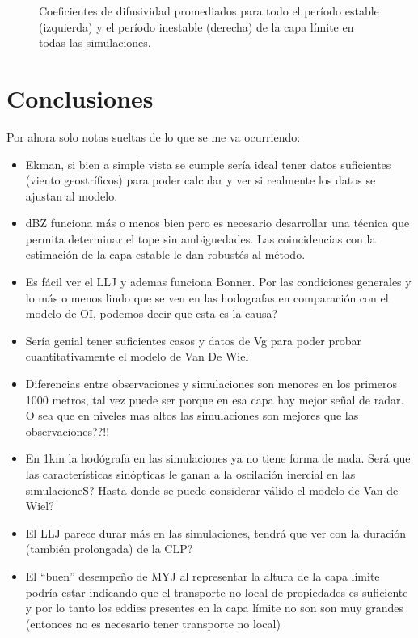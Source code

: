 \documentclass[12pt,spanish,oneside, a4paper]{book}
\providecommand{\tightlist}{%
  \setlength{\itemsep}{0pt}\setlength{\parskip}{0pt}}
\begin{document}
\begin{figure}

{\centering {}\newline{}

}

\caption{Coeficientes de difusividad promediados para todo el período estable (izquierda) y el período inestable (derecha) de la capa límite en todas las simulaciones. \label{kh_wrf}}\label{fig:k_ulke_wrf}
\end{figure}

\chapter{Conclusiones}\label{conclusiones}

Por ahora solo notas sueltas de lo que se me va ocurriendo:

\begin{itemize}
\tightlist
\item
  Ekman, si bien a simple vista se cumple sería ideal tener datos
  suficientes (viento geostríficos) para poder calcular y ver si
  realmente los datos se ajustan al modelo.
\item
  dBZ funciona más o menos bien pero es necesario desarrollar una
  técnica que permita determinar el tope sin ambiguedades. Las
  coincidencias con la estimación de la capa estable le dan robustés al
  método.
\item
  Es fácil ver el LLJ y ademas funciona Bonner. Por las condiciones
  generales y lo más o menos lindo que se ven en las hodografas en
  comparación con el modelo de OI, podemos decir que esta es la causa?
\item
  Sería genial tener suficientes casos y datos de Vg para poder probar
  cuantitativamente el modelo de Van De Wiel
\item
  Diferencias entre observaciones y simulaciones son menores en los
  primeros 1000 metros, tal vez puede ser porque en esa capa hay mejor
  señal de radar. O sea que en niveles mas altos las simulaciones son
  mejores que las observaciones??!!
\item
  En 1km la hodógrafa en las simulaciones ya no tiene forma de nada.
  Será que las características sinópticas le ganan a la oscilación
  inercial en las simulacioneS? Hasta donde se puede considerar válido
  el modelo de Van de Wiel?
\item
  El LLJ parece durar más en las simulaciones, tendrá que ver con la
  duración (también prolongada) de la CLP?
\item
  El ``buen'' desempeño de MYJ al representar la altura de la capa
  límite podría estar indicando que el transporte no local de
  propiedades es suficiente y por lo tanto los eddies presentes en la
  capa límite no son son muy grandes (entonces no es necesario tener
  transporte no local)
\end{itemize}
\end{document}
